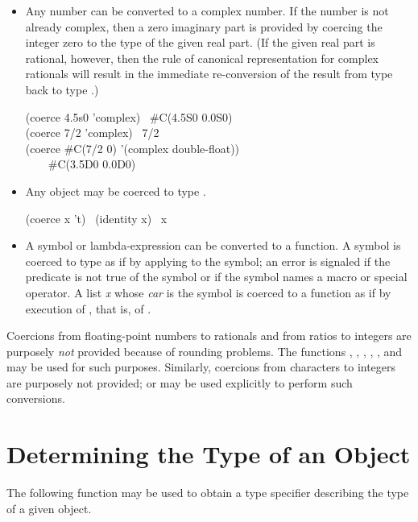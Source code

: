 \begin{defun}[Function]
\begin{itemize}
\item
Any number can be converted to a complex number.
If the number is not already complex, then a zero imaginary part
is provided by coercing the integer zero to the type of the given real part.
(If the given real part is rational, however, then the rule of
canonical representation for complex rationals will result
in the immediate re-conversion of the result from type 
back to type .)

\begin{lisp}
(coerce 4.5s0 'complex) \EV\ \#C(4.5S0 0.0S0) \\
(coerce 7/2 'complex) \EV\ 7/2 \\
(coerce \#C(7/2 0) '(complex double-float)) \\
~~~\EV\ \#C(3.5D0 0.0D0)
\end{lisp}

\item
Any object may be coerced to type .
\begin{lisp}
(coerce x 't) \EQ\ (identity x) \EQ\ x
\end{lisp}

\item
A symbol or lambda-expression can be converted to a function.
A symbol is coerced to type  as if by applying
 to the symbol; an error is signaled if the predicate
 is not true of
the symbol or if the symbol names a macro or special operator.
A list \emph{x} whose \emph{car} is the symbol 
is coerced to a function as if by execution of ,
that is, of .
\end{itemize}

Coercions from floating-point numbers to rationals and from ratios
to integers are purposely \emph{not} provided because of rounding
problems.  The functions , ,
, , , and  may be used for
such purposes.  Similarly, coercions from characters to integers
are purposely not provided;  or  may be
used explicitly to perform such conversions.
\end{defun}

\section{Determining the Type of an Object}

The following function may be used to obtain a type specifier
describing the type of a given object.

